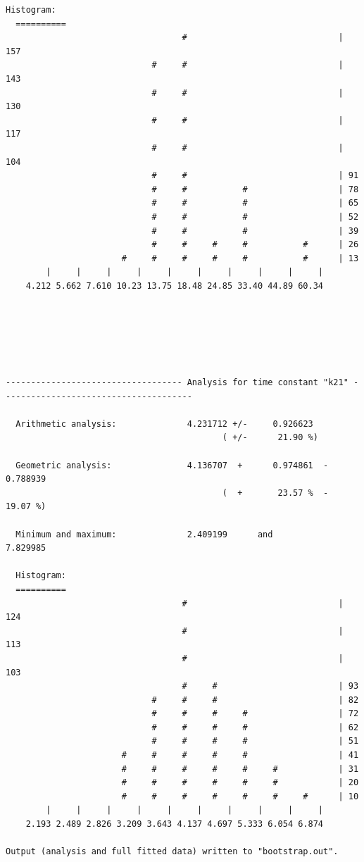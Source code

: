 \documentclass[a4paper,11pt,DIV=15,openany]{scrbook}
\begin{document}
\begin{oframed}
\begin{Verbatim}[commandchars=\\\{\}]
  Histogram:
  ==========
                                   #                              | 157
                             #     #                              | 143
                             #     #                              | 130
                             #     #                              | 117
                             #     #                              | 104
                             #     #                              | 91
                             #     #           #                  | 78
                             #     #           #                  | 65
                             #     #           #                  | 52
                             #     #           #                  | 39
                             #     #     #     #           #      | 26
                       #     #     #     #     #           #      | 13
        |     |     |     |     |     |     |     |     |     |  
    4.212 5.662 7.610 10.23 13.75 18.48 24.85 33.40 44.89 60.34

    
    
    
    
    
----------------------------------- Analysis for time constant "k21" --------------------------------------

  Arithmetic analysis:              4.231712 +/-     0.926623
                                           ( +/-      21.90 %)

  Geometric analysis:               4.136707  +      0.974861  -      0.788939
                                           (  +       23.57 %  -       19.07 %)

  Minimum and maximum:              2.409199      and           7.829985

  Histogram:
  ==========
                                   #                              | 124
                                   #                              | 113
                                   #                              | 103
                                   #     #                        | 93
                             #     #     #                        | 82
                             #     #     #     #                  | 72
                             #     #     #     #                  | 62
                             #     #     #     #                  | 51
                       #     #     #     #     #                  | 41
                       #     #     #     #     #     #            | 31
                       #     #     #     #     #     #            | 20
                       #     #     #     #     #     #     #      | 10
        |     |     |     |     |     |     |     |     |     |  
    2.193 2.489 2.826 3.209 3.643 4.137 4.697 5.333 6.054 6.874

Output (analysis and full fitted data) written to "bootstrap.out".

\end{Verbatim}
\end{oframed}
\end{document}
